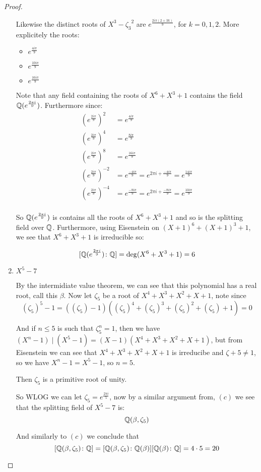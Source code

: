 \begin{exercise}
\begin{proof}
\begin{enumerate}[label=(\alph*)]
       Likewise the distinct roots of $X^3-{\zeta_3}^2$ are $e^{\frac{2i\pi(2+3k)}{9}}$, for $k=0,1,2$. More explicitely the roots:\begin{itemize}
        \item $e^{\frac{4i\pi}{9}}$
        \item $e^{\frac{10i\pi}{9}}$
        \item $e^{\frac{16i\pi}{9}}$
       \end{itemize}

       Note that any field containing the roots of $X^6+X^3+1$ contains the field $\mathbb{Q}(e^{\frac{2\pi i}{9}})$. Furthermore since:\begin{align*}
            {(e^{\frac{2i\pi}{9}})}^2 &= e^{\frac{4i\pi}{9}}\\
            {(e^{\frac{2i\pi}{9}})}^4 &= e^{\frac{8i\pi}{9}}\\
            {(e^{\frac{2i\pi}{9}})}^8 &= e^{\frac{16i\pi}{9}}\\
            {(e^{\frac{2i\pi}{9}})}^{-2} &= e^{\frac{-4i\pi}{9}} = e^{2\pi i + \frac{-4i\pi}{9}} = e^{\frac{14i\pi}{9}}\\
            {(e^{\frac{2i\pi}{9}})}^{-4} &= e^{\frac{-8i\pi}{9}} = e^{2\pi i + \frac{-8i\pi}{9}} = e^{\frac{10i\pi}{9}}\\
       \end{align*}

       So $\mathbb{Q}(e^{\frac{2\pi i}{9}})$ is contains all the roots of $X^6+X^3+1$ and so is the splitting field over $\mathbb{Q}$. Furthermore, using Eisenstein on ${(X+1)}^6+{(X+1)}^3+1$, we see that $X^6+X^3+1$ is irreducible so:
        
       \[[\mathbb{Q}(e^{\frac{2\pi i}{9}})\colon \mathbb{Q}] = \deg(X^6+X^3+1) = 6\]
        \item $X^5-7$
        
        By the intermidiate value theorem, we can see that this polynomial has a real root, call this $\beta$. Now let $\zeta_5$ be a root of $X^4+X^3+X^2+X+1$, note since \[{(\zeta_5)}^5-1 = ({(\zeta_5)} - 1)({(\zeta_5)}^4+{(\zeta_5)}^3+{(\zeta_5)}^2+{(\zeta_5)}+1) = 0\] 

        And if $n\leq 5$ is such that $\zeta_5^n = 1$, then we have $(X^n - 1)\mid (X^5-1) = (X-1)(X^4+X^3+X^2+X+1)$, but from Eisenstein we can see that $X^4+X^3+X^2+X+1$ is irreducibe and $\zeta+5\neq 1$, so we have $X^n-1=X^5-1$, so $n=5$.

       Then $\zeta_5$ is a primitive root of unity.
    
       So WLOG we can let $\zeta_5 = e^{\frac{2\pi i }{5}}$, now by a similar argument from, $(c)$ we see that the splitting field of $X^5-7$ is:\[\mathbb{Q}(\beta,\zeta_5)\]

       And similarly to $(c)$ we conclude that \[[\mathbb{Q}(\beta,\zeta_5)\colon \mathbb{Q}] = [\mathbb{Q}(\beta,\zeta_5)\colon \mathbb{Q}(\beta)][\mathbb{Q}(\beta)\colon \mathbb{Q}] = 4\cdot 5 = 20 \]
    \end{enumerate}
\end{proof}
\end{exercise}







